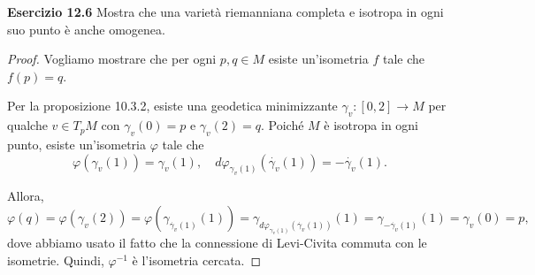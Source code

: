 \documentclass[a4paper]{article}
\theoremstyle{definition}
\theoremstyle{definition}
\theoremstyle{remark}
\theoremstyle{definition}
\begin{document}
\textbf{Esercizio 12.6}
Mostra che una varietà riemanniana completa e isotropa in ogni suo punto è anche omogenea.
\begin{proof}
	Vogliamo mostrare che per ogni $p, q \in M$ esiste un'isometria $f$ tale che $f(p)=q$.

	Per la proposizione 10.3.2, esiste una geodetica minimizzante $\gamma_v: [0,2] \to M$ per qualche $v\in T_p M$ con $\gamma_v(0)=p$ e $\gamma_v(2)=q$. Poiché $M$ è isotropa in ogni punto, esiste un'isometria $\varphi$ tale che \[\varphi(\gamma_v(1))=\gamma_v(1), \quad d\varphi_{\gamma_v(1)}(\dot{\gamma_v}(1))=-\dot{\gamma_v}(1).\]

	Allora, \[\varphi(q)=\varphi(\gamma_v(2))=\varphi(\gamma_{\dot{\gamma_v}(1)}(1))=\gamma_{d\varphi_{\gamma_v(1)}(\dot{\gamma_v}(1))}(1)=\gamma_{-\dot{\gamma_v}(1)}(1)=\gamma_v(0)=p,\] dove abbiamo usato il fatto che la connessione di Levi-Civita commuta con le isometrie. Quindi, $\varphi^{-1}$ è l'isometria cercata.
\end{proof}
\end{document}
